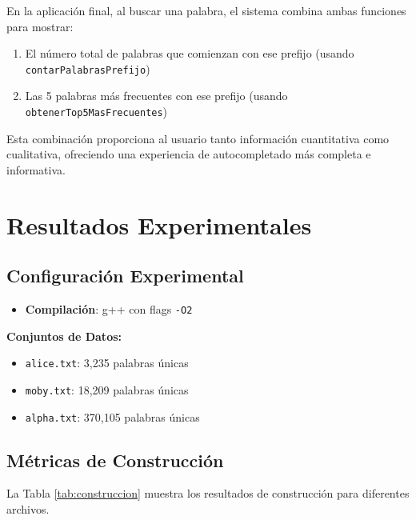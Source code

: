 \documentclass[11pt,a4paper]{article}
\begin{document}
En la aplicación final, al buscar una palabra, el sistema combina ambas funciones para mostrar:
\begin{enumerate}
    \item El número total de palabras que comienzan con ese prefijo (usando \texttt{contarPalabrasPrefijo})
    \item Las 5 palabras más frecuentes con ese prefijo (usando \texttt{obtenerTop5MasFrecuentes})
\end{enumerate}

Esta combinación proporciona al usuario tanto información cuantitativa como cualitativa, ofreciendo una experiencia de autocompletado más completa e informativa.

\section{Resultados Experimentales}

\subsection{Configuración Experimental}

\begin{itemize}
    \item \textbf{Compilación}: g++ con flags \texttt{-O2}
\end{itemize}

\textbf{Conjuntos de Datos:}
\begin{itemize}
    \item \texttt{alice.txt}: 3,235 palabras únicas
    \item \texttt{moby.txt}: 18,209 palabras únicas
    \item \texttt{alpha.txt}: 370,105 palabras únicas
\end{itemize}

\subsection{Métricas de Construcción}

La Tabla \ref{tab:construccion} muestra los resultados de construcción para diferentes archivos.
\end{document}
